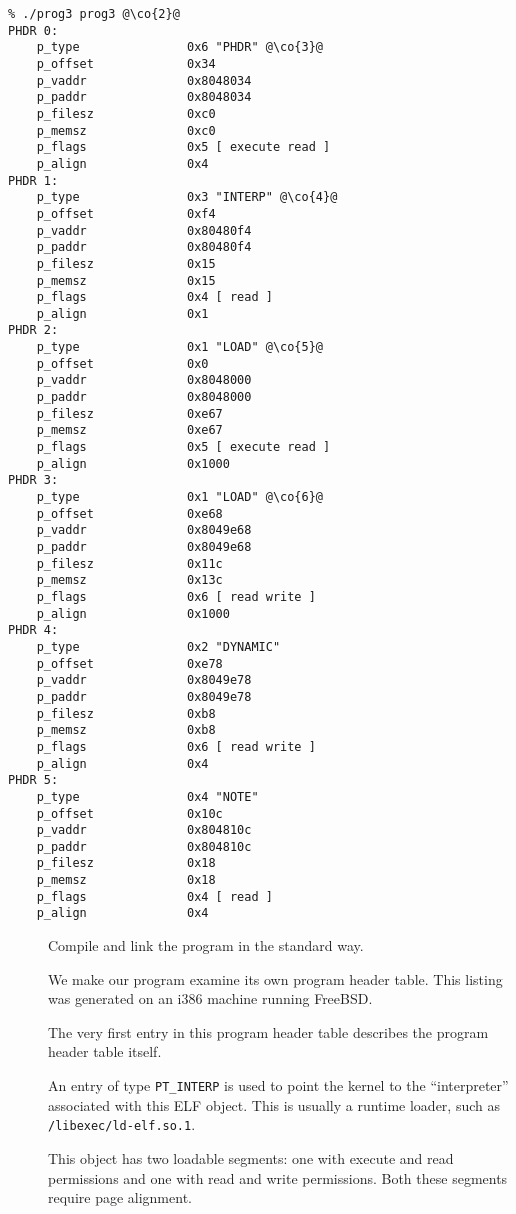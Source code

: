 \documentclass[a4paper,pdftex]{book}
\makeatletter
\newcommand{\constant}[1]{\texttt{#1}}
\newcommand{\filename}[1]{\texttt{#1}}
\newcommand{\trade}{\texttrademark\xspace}
\newenvironment{callout}[2][black]{%
  \begingroup\newcommand{\@cocolor}{#1}%
  \setlength{\shadowsize}{1.2pt}%
  \newcommand{\@cogroup}[1]{#2}}{\endgroup}
\newcommand{\@co}[1]{\shadowbox{\color{\@cocolor}#1}}
\newcommand{\co}[1]{%
  \hypertarget{\@cogroup.#1.co}{%
    \hyperlink{\@cogroup.#1.cr}{\@co{#1}}}}
\newcommand{\coref}[1]{%
  \hypertarget{\@cogroup.#1.cr}{%
    \hyperlink{\@cogroup.#1.co}{\@co{#1}}}}
\makeatother
\begin{document}
\begin{callout}{scr3}
  \begin{lstlisting}[language={}, basicstyle=\small\ttfamily,
      label=scr.prog3, caption=Compiling and Running prog3]
% cc -o prog3 prog3.c -lelf @\co{1}@
% ./prog3 prog3 @\co{2}@
PHDR 0:
    p_type               0x6 "PHDR" @\co{3}@
    p_offset             0x34
    p_vaddr              0x8048034
    p_paddr              0x8048034
    p_filesz             0xc0
    p_memsz              0xc0
    p_flags              0x5 [ execute read ]
    p_align              0x4
PHDR 1:
    p_type               0x3 "INTERP" @\co{4}@
    p_offset             0xf4
    p_vaddr              0x80480f4
    p_paddr              0x80480f4
    p_filesz             0x15
    p_memsz              0x15
    p_flags              0x4 [ read ]
    p_align              0x1
PHDR 2:
    p_type               0x1 "LOAD" @\co{5}@
    p_offset             0x0
    p_vaddr              0x8048000
    p_paddr              0x8048000
    p_filesz             0xe67
    p_memsz              0xe67
    p_flags              0x5 [ execute read ]
    p_align              0x1000
PHDR 3:
    p_type               0x1 "LOAD" @\co{6}@
    p_offset             0xe68
    p_vaddr              0x8049e68
    p_paddr              0x8049e68
    p_filesz             0x11c
    p_memsz              0x13c
    p_flags              0x6 [ read write ]
    p_align              0x1000
PHDR 4:
    p_type               0x2 "DYNAMIC"
    p_offset             0xe78
    p_vaddr              0x8049e78
    p_paddr              0x8049e78
    p_filesz             0xb8
    p_memsz              0xb8
    p_flags              0x6 [ read write ]
    p_align              0x4
PHDR 5:
    p_type               0x4 "NOTE"
    p_offset             0x10c
    p_vaddr              0x804810c
    p_paddr              0x804810c
    p_filesz             0x18
    p_memsz              0x18
    p_flags              0x4 [ read ]
    p_align              0x4
  \end{lstlisting}

  \begin{description}
  \item[\coref{1}] Compile and link the program in the standard way.
  \item[\coref{2}] We make our program examine its own program header
    table.  This listing was generated on an i386\trade machine
    running FreeBSD\texttrademark.
  \item[\coref{3}] The very first entry in this program header table
    describes the program header table itself.%
  \item[\coref{4}] An entry of type \constant{PT\_INTERP} is used to
    point the kernel to the ``interpreter'' associated with this ELF
    object.  This is usually a runtime loader, such as
    \filename{/libexec/ld-elf.so.1}.
  \item[\coref{5} \coref{6}] This object has two loadable segments:
    one with execute and read permissions and one with read and write
    permissions.  Both these segments require page alignment.%
  \end{description}
\end{callout}
\end{document}
